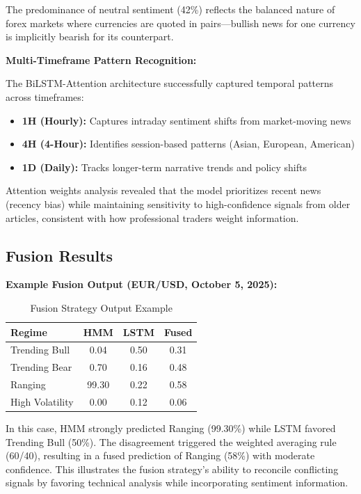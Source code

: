 \documentclass[conference]{IEEEtran}
\begin{document}
The predominance of neutral sentiment (42\%) reflects the balanced nature of forex markets where currencies are quoted in pairs—bullish news for one currency is implicitly bearish for its counterpart.

\textbf{Multi-Timeframe Pattern Recognition:}

The BiLSTM-Attention architecture successfully captured temporal patterns across timeframes:
\begin{itemize}
\item \textbf{1H (Hourly):} Captures intraday sentiment shifts from market-moving news
\item \textbf{4H (4-Hour):} Identifies session-based patterns (Asian, European, American)
\item \textbf{1D (Daily):} Tracks longer-term narrative trends and policy shifts
\end{itemize}

Attention weights analysis revealed that the model prioritizes recent news (recency bias) while maintaining sensitivity to high-confidence signals from older articles, consistent with how professional traders weight information.

\subsection{Fusion Results}

\textbf{Example Fusion Output (EUR/USD, October 5, 2025):}

\begin{table}[htbp]
\centering
\caption{Fusion Strategy Output Example}
\label{tab:fusion_example}
\begin{tabular}{lccc}
\toprule
\textbf{Regime} & \textbf{HMM} & \textbf{LSTM} & \textbf{Fused} \\
\midrule
Trending Bull & 0.04 & 0.50 & 0.31 \\
Trending Bear & 0.70 & 0.16 & 0.48 \\
Ranging & 99.30 & 0.22 & 0.58 \\
High Volatility & 0.00 & 0.12 & 0.06 \\
\bottomrule
\end{tabular}
\end{table}

In this case, HMM strongly predicted Ranging (99.30\%) while LSTM favored Trending Bull (50\%). The disagreement triggered the weighted averaging rule (60/40), resulting in a fused prediction of Ranging (58\%) with moderate confidence. This illustrates the fusion strategy's ability to reconcile conflicting signals by favoring technical analysis while incorporating sentiment information.
\end{document}
